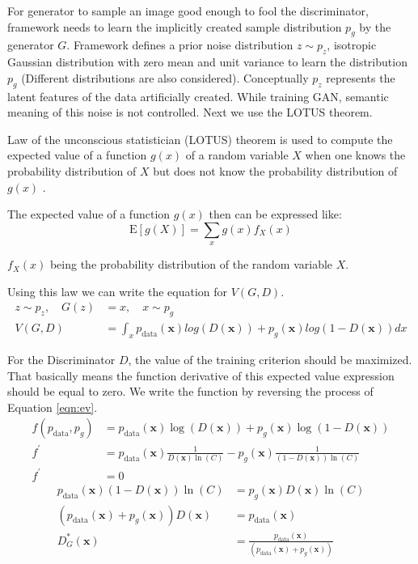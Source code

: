 {For generator to sample an image good enough to fool the discriminator, framework needs to learn the
implicitly created sample distribution $p_g$ by the generator $G$. Framework defines a prior noise
distribution $z \sim p_z$, isotropic Gaussian distribution with zero mean and unit variance to learn
the distribution $p_g$ (Different distributions are also considered). Conceptually $p_z$ represents the 
latent features of the data artificially created. While training GAN, semantic meaning of this noise is not controlled.
Next we use the LOTUS theorem.

\begin{theorem}
Law of the unconscious statistician (LOTUS) theorem is used to compute the expected value of a 
function $g(x)$ of a random variable $X$  when one knows the probability distribution of $X$ but 
does not know the probability distribution of $g(x)$ .
\end{theorem}

The expected value of a function $g(x)$ then can be expressed like:
\begin{equation}
    \mathrm{E}[g(X)]=\sum_{x} g(x) f_{X}(x)  
\end{equation}

$f_{X}(x)$ being the probability distribution of the random variable $X$. 

Using this law we can write the equation for $V(G, D)$. 
\begin{align}
    z \sim p_z , \quad G(z) &= x, \quad x \sim p_g\\ 
    V( G, D) &= \int_x p_{\text{data}}(\boldsymbol{x}) log(D(\boldsymbol{x})) + p_g(\boldsymbol{x}) log(1 - D(\boldsymbol{x})) dx
\end{align}

For the Discriminator $D$, the value of the training criterion should be maximized. That basically means the
function derivative of this expected value expression should be equal to zero. We write the
function by reversing the process of Equation \ref{eqn:ev}.
\begin{align}
    f( p_{\text{data}}, p_g) &= p_{\text{data}}(\boldsymbol{x}) \log(D(\boldsymbol{x})) + p_g(\boldsymbol{x}) \log(1 - D(\boldsymbol{x})) \\[5pt]
    f^{\prime} &= p_{\text{data}}(\boldsymbol{x}) \frac{1}{D(\boldsymbol{x}) \ln(C)} - p_g(\boldsymbol{x}) \frac{1}{(1- D(\boldsymbol{x})) \ln(C)} \\[5pt]
    f^{\prime} &= 0
\end{align}
\begin{align}
    p_{\text{data}}(\boldsymbol{x}) (1- D(\boldsymbol{x})) \ln(C) &= p_g(\boldsymbol{x}) D(\boldsymbol{x}) \ln(C)\\[5pt]
    (p_{\text{data}}(\boldsymbol{x}) +  p_g(\boldsymbol{x})) D(\boldsymbol{x}) &= p_{\text{data}}(\boldsymbol{x})\\[5pt]
    D^{*}_G(\boldsymbol{x}) &= \frac{p_{\text{data}}(\boldsymbol{x})}{(p_{\text{data}}(\boldsymbol{x}) +  p_g(\boldsymbol{x}))}\label{eqn:opt_d}
\end{align}

}
